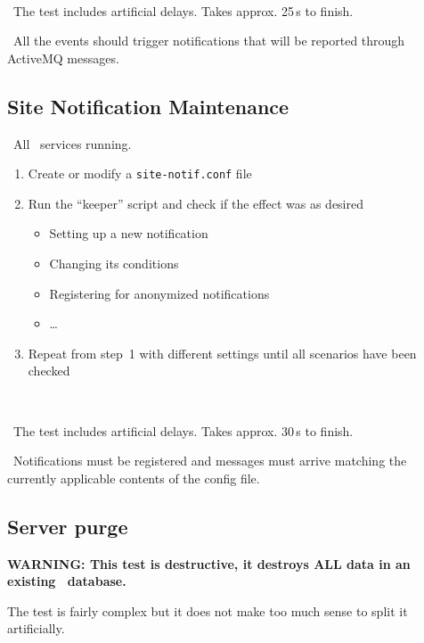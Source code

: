 \how\ 

\note\ The test includes artificial delays. Takes approx. 25\,s to finish.

\result\ All the events should trigger notifications that will be reported 
through ActiveMQ messages.



\subsection{Site Notification Maintenance}
\label{notifkeeper}

\req\ All \LB\ services running.

\what
\begin{enumerate}
\item Create or modify a \texttt{site-notif.conf} file
\item Run the ``keeper'' script and check if the effect was as desired
\begin{itemize}
\item Setting up a new notification
\item Changing its conditions
\item Registering for anonymized notifications
\item \dots
\end{itemize}
\item Repeat from step~1 with different settings until all scenarios have been checked
\end{enumerate}

\how\ 

\note\ The test includes artificial delays. Takes approx. 30\,s to finish.

\result\ Notifications must be registered and messages must arrive matching the currently applicable contents of the config file.


\subsection{Server purge}

\textbf{WARNING: This test is destructive, it destroys ALL data in an
existing \LB\ database.}

The test is fairly complex but it does not make too much sense to split it
artificially.

